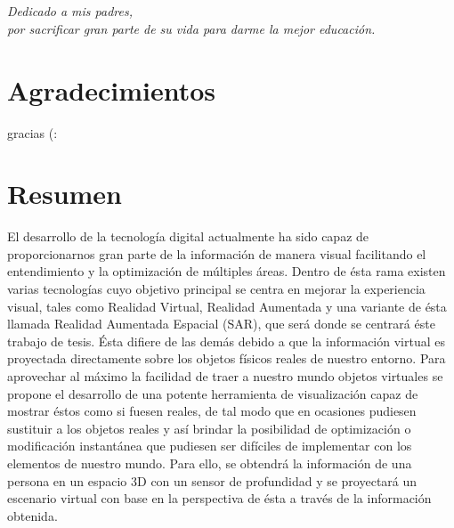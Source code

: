 \documentclass[a4paper,openright,12pt]{report}
\begin{document}
\chapter*{}
\begin{flushright}
\textit{Dedicado a mis padres, \\ por sacrificar gran parte de su vida para darme la mejor educación.\\}
\end{flushright}

\chapter*{Agradecimientos}

gracias (:

\chapter*{Resumen}

El desarrollo de la tecnología digital actualmente ha sido capaz de proporcionarnos gran parte de la información de manera visual facilitando el entendimiento y la optimización de múltiples áreas. Dentro de ésta rama existen varias tecnologías cuyo objetivo principal se centra en mejorar la experiencia visual, tales como Realidad Virtual, Realidad Aumentada y una variante de ésta llamada Realidad Aumentada Espacial (SAR), que será donde se centrará éste trabajo de tesis. Ésta difiere de las demás debido a que la información virtual es proyectada directamente sobre los objetos físicos reales de nuestro entorno. Para aprovechar al máximo la facilidad de traer a nuestro mundo objetos virtuales se propone el desarrollo de una potente herramienta de visualización capaz de mostrar éstos como si fuesen reales, de tal modo que en ocasiones pudiesen sustituir a los objetos reales y así brindar la posibilidad de optimización o modificación instantánea que pudiesen ser difíciles de implementar con los elementos de nuestro mundo. Para ello, se obtendrá la información de una persona en un espacio 3D con un sensor de profundidad y se proyectará un escenario virtual con base en la perspectiva de ésta a través de la información obtenida.


\tableofcontents
\cleardoublepage
{}
\listoffigures
\cleardoublepage
{}
\listoftables
\end{document}
